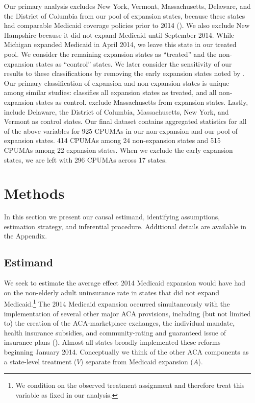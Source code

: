 \documentclass[12pt]{article}
\begin{document}
Our primary analysis excludes New York, Vermont, Massachusetts, Delaware, and the District of Columbia from our pool of expansion states, because these states had comparable Medicaid coverage policies prior to 2014 (\cite{kaestner2017effects}). We also exclude New Hampshire because it did not expand Medicaid until September 2014. While Michigan expanded Medicaid in April 2014, we leave this state in our treated pool. We consider the remaining expansion states as ``treated'' and the non-expansion states as ``control'' states. We later consider the sensitivity of our results to these classifications by removing the early expansion states noted by \cite{frean2017premium}. Our primary classification of expansion and non-expansion states is unique among similar studies: \cite{courtemanche2017early} classifies all expansion states as treated, and all non-expansion states as control. \cite{frean2017premium} exclude Massachusetts from expansion states. Lastly, \cite{kaestner2017effects} include Delaware, the District of Columbia, Massachusetts, New York, and Vermont as control states. Our final dataset contains aggregated statistics for all of the above variables for 925 CPUMAs in our non-expansion and our pool of expansion states. 414 CPUMAs among 24 non-expansion states and 515 CPUMAs among 22 expansion states. When we exclude the early expansion states, we are left with 296 CPUMAs across 17 states.

\section{Methods}
\label{sec:methods}

In this section we present our causal estimand, identifying assumptions, estimation strategy, and inferential procedure. Additional details are available in the Appendix.

\subsection{Estimand}

We seek to estimate the average effect 2014 Medicaid expansion would have had on the non-elderly adult uninsurance rate in states that did not expand Medicaid.\footnote{We condition on the observed treatment assignment and therefore treat this variable as fixed in our analysis.} The 2014 Medicaid expansion occurred simultaneously with the implementation of several other major ACA provisions, including (but not limited to) the creation of the ACA-marketplace exchanges, the individual mandate, health insurance subsidies, and community-rating and guaranteed issue of insurance plans (\cite{courtemanche2017early}). Almost all states broadly implemented these reforms beginning January 2014. Conceptually we think of the other ACA components as a state-level treatment ($V$) separate from Medicaid expansion ($A$).
\end{document}
